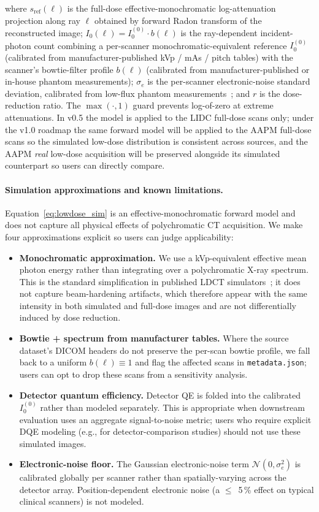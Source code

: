 \documentclass[twoside,11pt]{article}
\begin{document}
where $s_{\textrm{ref}}(\ell)$ is the full-dose effective-monochromatic log-attenuation projection along ray $\ell$ obtained by forward Radon transform of the reconstructed image; $I_0(\ell) = I_0^{(0)} \cdot b(\ell)$ is the ray-dependent incident-photon count combining a per-scanner monochromatic-equivalent reference $I_0^{(0)}$ (calibrated from manufacturer-published kVp / mAs / pitch tables) with the scanner's bowtie-filter profile $b(\ell)$ (calibrated from manufacturer-published or in-house phantom measurements); $\sigma_e$ is the per-scanner electronic-noise standard deviation, calibrated from low-flux phantom measurements~\citep{zeng2015nonlocal}; and $r$ is the dose-reduction ratio. The $\max(\cdot,1)$ guard prevents log-of-zero at extreme attenuations. In v0.5 the model is applied to the LIDC full-dose scans only; under the v1.0 roadmap the same forward model will be applied to the AAPM full-dose scans so the simulated low-dose distribution is consistent across sources, and the AAPM \textit{real} low-dose acquisition will be preserved alongside its simulated counterpart so users can directly compare.

\paragraph{Simulation approximations and known limitations.} Equation~\eqref{eq:lowdose_sim} is an effective-monochromatic forward model and does not capture all physical effects of polychromatic CT acquisition. We make four approximations explicit so users can judge applicability:

\begin{itemize}
    \item \textbf{Monochromatic approximation.} We use a kVp-equivalent effective mean photon energy rather than integrating over a polychromatic X-ray spectrum. This is the standard simplification in published LDCT simulators~\citep{zeng2015nonlocal,wang2020deeplearningreview}; it does not capture beam-hardening artifacts, which therefore appear with the same intensity in both simulated and full-dose images and are not differentially induced by dose reduction.
    \item \textbf{Bowtie + spectrum from manufacturer tables.} Where the source dataset's DICOM headers do not preserve the per-scan bowtie profile, we fall back to a uniform $b(\ell) \equiv 1$ and flag the affected scans in \texttt{metadata.json}; users can opt to drop these scans from a sensitivity analysis.
    \item \textbf{Detector quantum efficiency.} Detector QE is folded into the calibrated $I_0^{(0)}$ rather than modeled separately. This is appropriate when downstream evaluation uses an aggregate signal-to-noise metric; users who require explicit DQE modeling (e.g., for detector-comparison studies) should not use these simulated images.
    \item \textbf{Electronic-noise floor.} The Gaussian electronic-noise term $\mathcal{N}(0,\sigma_e^2)$ is calibrated globally per scanner rather than spatially-varying across the detector array. Position-dependent electronic noise (a $\leq$~5\,\% effect on typical clinical scanners) is not modeled.
\end{itemize}
\end{document}

